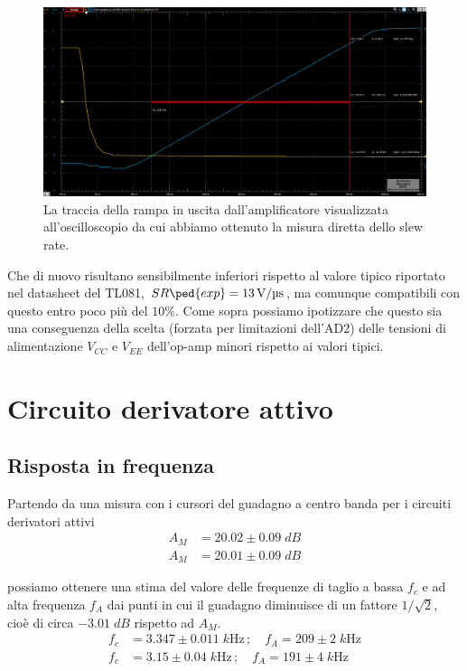 \documentclass[10pt, a4paper, italian]{article}
\begin{document}
\begin{figure}[htbp]
\centering
\includegraphics[scale=0.37]{slew}
\caption{La traccia della rampa in uscita dall'amplificatore visualizzata
all'oscilloscopio da cui abbiamo ottenuto la misura diretta dello slew rate.
\label{fig: slewrate}}
\end{figure}

Che di nuovo risultano sensibilmente inferiori rispetto al valore tipico
riportato nel datasheet del TL081, $SR\ped{exp} = \SI{13}{\V/\micro\s}$,
ma comunque compatibili con questo entro poco più del $10\%$. Come sopra
possiamo ipotizzare che questo sia una conseguenza della scelta (forzata
per limitazioni dell'AD2) delle tensioni di alimentazione $V_{CC}$ e $V_{EE}$
dell'op-amp minori rispetto ai valori tipici.

\section{Circuito derivatore attivo}
\subsection{Risposta in frequenza}
Partendo da una misura con i cursori del guadagno a centro banda per i
circuiti derivatori attivi
\begin{align*}
A_M &= 20.02 \pm  0.09 \; \si{dB} \\
A_M &= 20.01 \pm  0.09 \; \si{dB}
\end{align*}

possiamo ottenere una stima del valore delle frequenze di taglio a bassa
$f_c$ e ad alta frequenza $f_A$ dai punti in cui il guadagno diminuisce di un
fattore $1/\sqrt{2}$, cioè di circa $-3.01 \; \si{dB}$ rispetto ad $A_M$.
\begin{align*}
f_c &= 3.347 \pm 0.011 \; \si{k\Hz} \, ; \quad f_A = 209 \pm 2 \; \si{k\Hz} \\
f_c &= 3.15 \pm 0.04 \; \si{k\Hz} \, ; \quad f_A = 191 \pm 4 \; \si{k\Hz}
\end{align*}
\end{document}
